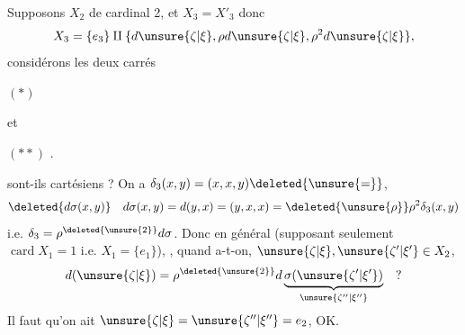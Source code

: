 
Supposons  $X_2$ de cardinal 2,  et  $X_3=X'_3$ donc
\[
X_3=\{e_3\}\amalg\{d\unsure{\zeta|\xi},\rho d\unsure{\zeta|\xi},\rho^2d\unsure{\zeta|\xi}\},
\]
considérons les deux carrés

$(*)$

et

$(**)$
.

sont-ils cartésiens ? On a $\delta_3(x,y)=(x,x,y)\deleted{\unsure{=}}$,
\[
\deleted{d\sigma(x,y)}\quad d\sigma(x,y)=d(y,x)=(y,x,x)=\deleted{\unsure{\rho}}\rho^2\delta_3(x,y)
\]
i.e. $\delta_3=\rho^{\deleted{\unsure{2}}}d\sigma$. Donc en général (supposant seulement $\operatorname{card}X_1=1$ i.e. $X_1=\{e_1\}$),  , quand a-t-on,  $\unsure{\zeta|\xi},\unsure{\zeta'|\xi'}\in X_2$,
\[
d(\unsure{\zeta|\xi})=\rho^{\deleted{\unsure{2}}}d\underbrace{\sigma(\unsure{\zeta'|\xi'})}_{\unsure{\zeta''|\xi''}}\quad ?
\]
Il faut  qu'on ait 
$\unsure{\zeta|\xi}=\unsure{\zeta''|\xi''}=e_2$,  $\boxed{\text{OK}}$.

